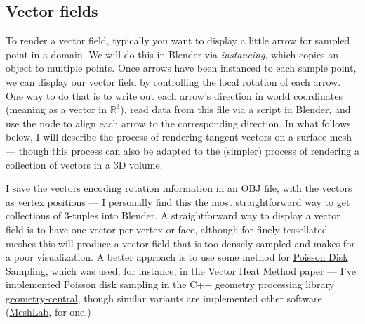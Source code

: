 \documentclass[10pt]{article}
\newcommand{\obj}[1]{\menu{\color{magenta} #1}}
\newcommand{\R}{\mathbb{R}}
\begin{document}
\subsection{Vector fields}
\label{sec:VectorFields}
To render a vector field, typically you want to display a little arrow for sampled point in a domain. We will do this in Blender via \emph{instancing}, which copies an object to multiple points. Once arrows have been instanced to each sample point, we can display our vector field by controlling the local rotation of each arrow. One way to do that is to write out each arrow's direction in world coordinates (meaning as a vector in $\R^3$), read data from this file via a script in Blender, and use the \obj{Align Euler to Vector} node to align each arrow to the corresponding direction. In what follows below, I will describe the process of rendering tangent vectors on a surface mesh --- though this process can also be adapted to the (simpler) process of rendering a collection of vectors in a 3D volume.

I save the vectors encoding rotation information in an OBJ file, with the vectors as vertex positions --- I personally find this the most straightforward way to get collections of 3-tuples into Blender. A straightforward way to display a vector field is to have one vector per vertex or face, although for finely-tessellated meshes this will produce a vector field that is too densely sampled and makes for a poor visualization. A better approach is to use some method for \href{https://www.cs.ubc.ca/~rbridson/docs/bridson-siggraph07-poissondisk.pdf}{Poisson Disk Sampling}, which was used, for instance, in the \href{https://www.cs.cmu.edu/~kmcrane/Projects/VectorHeatMethod/paper.pdf}{Vector Heat Method paper} --- I've implemented Poisson disk sampling in the C++ geometry processing library \href{https://geometry-central.net/surface/algorithms/surface_sampling/}{geometry-central}, though similar variants are implemented other software (\href{https://www.meshlab.net/}{MeshLab}, for one.)
\end{document}
